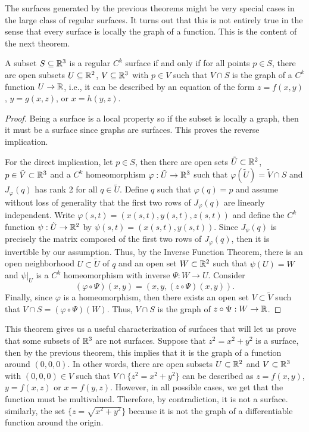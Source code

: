 The surfaces generated by the previous theorems might be very special cases in the large class of regular surfaces. It turns out that this is not entirely true in the sense that every surface is locally the graph of a function. This is the content of the next theorem.

\begin{theorem}
    A subset $S \subseteq \mathbb{R}^3$ is a regular $C^k$ surface if and only if for all points $p \in S$, there are open subsets $U \subseteq \mathbb{R}^2$, $V \subseteq \mathbb{R}^3$ with $p \in V$ such that $V \cap S$ is the graph of a $C^k$ function $U \to \mathbb{R}$, i.e., it can be described by an equation of the form $z = f(x,y)$, $y = g(x,z)$, or $x = h(y,z)$.
\end{theorem}

\begin{proof}
    Being a surface is a local property so if the subset is locally a graph, then it must be a surface since graphs are surfaces. This proves the reverse implication.
    
    For the direct implication, let $p \in S$, then there are open sets $\tilde{U} \subset \mathbb{R}^2$, $p \in \tilde{V} \subset \mathbb{R}^3$ and a $C^k$ homeomorphism $\varphi : \tilde{U} \to \mathbb{R}^3$ such that $\varphi(\tilde{U}) = \tilde{V}\cap S$ and $J_{\varphi}(q)$ has rank 2 for all $q \in \tilde{U}$. Define $q$ such that $\varphi(q) = p$ and assume without loss of generality that the first two rows of $J_{\varphi}(q)$ are linearly independent. Write $\varphi(s,t) = (x(s,t), y(s,t), z(s,t))$ and define the $C^k$ function $\psi : \tilde{U} \to \mathbb{R}^2$ by $\psi(s,t) = (x(s,t), y(s,t))$. Since $J_{\psi}(q)$ is precisely the matrix composed of the first two rows of $J_{\varphi}(q)$, then it is invertible by our assumption. Thus, by the Inverse Function Theorem, there is an open neighborhood $U \subset \tilde{U}$ of $q$ and an open set $W \subset \mathbb{R}^2$ such that $\psi(U) = W$ and $\psi|_U$ is a $C^k$ homeomorphism with inverse $\Psi : W \to U$. Consider
    $$(\varphi \circ \Psi)(x,y) = (x,y, (z\circ \Psi)(x,y)).$$
    Finally, since $\varphi$ is a homeomorphism, then there exists an open set $V \subset \tilde{V}$ such that $V \cap S = (\varphi\circ \Psi)(W)$. Thus, $V \cap S$ is the graph of $z\circ \Psi : W \to \mathbb{R}$.
\end{proof}

This theorem gives us a useful characterization of surfaces that will let us prove that some subsets of $\mathbb{R}^3$ are not surfaces. Suppose that $z^2 = x^2 + y^2$ is a surface, then by the previous theorem, this implies that it is the graph of a function around $(0,0,0)$. In other words, there are open subsets $U \subset \mathbb{R}^2$ and $V \subset \mathbb{R}^3$ with $(0,0,0) \in V$ such that $V \cap \{z^2 = x^2 + y^2\}$ can be described as $z = f(x,y)$, $y = f(x,z)$ or $x = f(y,z)$. However, in all possible cases, we get that the function must be multivalued. Therefore, by contradiction, it is not a surface. similarly, the set $\{z = \sqrt{x^2 + y^2}\}$ because it is not the graph of a differentiable function around the origin.